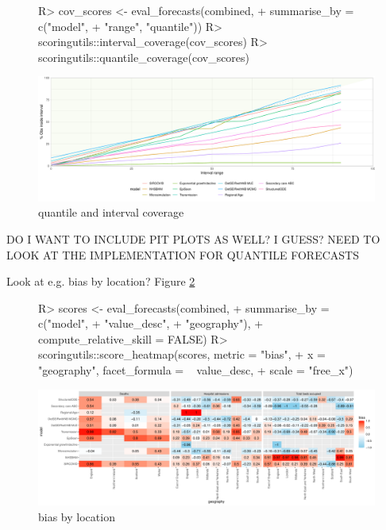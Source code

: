 \documentclass[article,shortnames]{jss}
\begin{document}
\begin{figure}[h!]
\centering
\begin{Schunk}
\begin{Sinput}
R> cov_scores <- eval_forecasts(combined, 
+                               summarise_by = c("model", 
+                                                "range", "quantile"))
R> scoringutils::interval_coverage(cov_scores)
R> scoringutils::quantile_coverage(cov_scores)
\end{Sinput}
\end{Schunk}
\includegraphics{plots/plot-coverage}

\caption{\label{fig:coverage} quantile and interval coverage}
\end{figure}


DO I WANT TO INCLUDE PIT PLOTS AS WELL? I GUESS? NEED TO LOOK AT THE IMPLEMENTATION FOR QUANTILE FORECASTS

% 

Look at e.g. bias by location? Figure \ref{fig:bias-heatmap}

\begin{figure}[h]
\centering
\begin{Schunk}
\begin{Sinput}
R> scores <- eval_forecasts(combined, 
+                           summarise_by = c("model",
+                                            "value_desc", 
+                                            "geography"), 
+                           compute_relative_skill = FALSE)
R> scoringutils::score_heatmap(scores, metric = "bias", 
+                              x = "geography", facet_formula = ~ value_desc, 
+                              scale = "free_x")
\end{Sinput}
\end{Schunk}
\includegraphics{plots/plot-calibration}
\caption{\label{fig:bias-heatmap} bias by location}
\end{figure}
\end{document}
